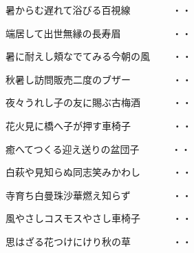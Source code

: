 \vspace{0.6cm}
\begin{shiika}暑からむ遅れて浴びる百視線　　　　
\hfill{・・}\end{shiika}
\vspace{0.6cm}
\begin{shiika}端居して出世無縁の長寿眉　　　　　
\hfill{・・}\end{shiika}
\vspace{0.6cm}
\begin{shiika}暑に耐えし頬なでてみる今朝の風　　
\hfill{・・}\end{shiika}
\vspace{0.6cm}
\begin{shiika}秋暑し訪問販売二度のブザー　　　　
\hfill{・・}\end{shiika}
\vspace{0.6cm}
\begin{shiika}夜々うれし子の友に賜ぶ古梅酒　　　
\hfill{・・}\end{shiika}
\vspace{0.6cm}
\begin{shiika}花火見に橋へ子が押す車椅子　　　　
\hfill{・・}\end{shiika}
\vspace{0.6cm}
\begin{shiika}癒へてつくる迎え送りの盆団子　　　
\hfill{・・}\end{shiika}
\vspace{0.6cm}
\begin{shiika}白萩や見知らぬ同志笑みかわし　　　
\hfill{・・}\end{shiika}
\vspace{0.6cm}
\begin{shiika}寺育ち白曼珠沙華燃え知らず　　　　
\hfill{・・}\end{shiika}
\vspace{0.6cm}
\begin{shiika}風やさしコスモスやさし車椅子　　　
\hfill{・・}\end{shiika}
\vspace{0.6cm}
\begin{shiika}思はざる花つけにけり秋の草　　　　
\hfill{・・}\end{shiika}
